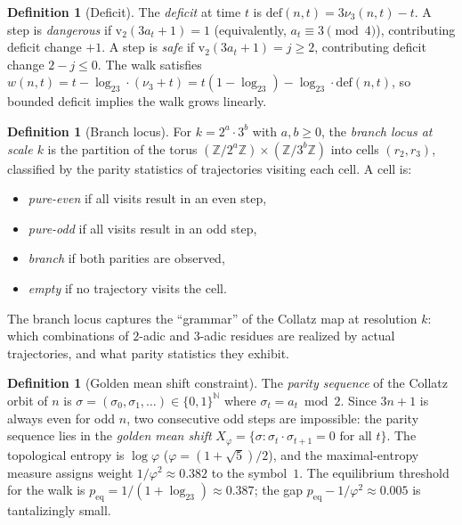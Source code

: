 \documentclass{CUP-JNL-FMP}%
\theoremstyle{definition}
\newtheorem{definition}[theorem]{Definition}
\numberwithin{equation}{section}
\newcommand{\ZZ}{\mathbb{Z}}
\newcommand{\NN}{\mathbb{N}}
\newcommand{\val}{\mathrm{v}_2}
\newcommand{\deficit}{\mathrm{def}}
\newcommand{\logb}{\log_2}
\begin{document}
\begin{definition}[Deficit]\label{def:deficit}
  The \emph{deficit} at time $t$ is $\deficit(n,t) = 3\nu_3(n,t) - t$.
  A step is \emph{dangerous} if $\val(3a_t+1) = 1$ (equivalently,
  $a_t \equiv 3 \pmod{4}$), contributing deficit change $+1$.
  A step is \emph{safe} if $\val(3a_t+1) = j \geq 2$, contributing
  deficit change $2 - j \leq 0$.  The walk satisfies
  $w(n,t) = t - \logb 3 \cdot (\nu_3 + t) = t(1 - \logb 3) - \logb 3 \cdot \deficit(n,t)$,
  so bounded deficit implies the walk grows linearly.
\end{definition}

\begin{definition}[Branch locus]\label{def:branchlocus}
  For $k = 2^a \cdot 3^b$ with $a, b \geq 0$, the \emph{branch locus at scale $k$}
  is the partition of the torus $(\ZZ/2^a\ZZ) \times (\ZZ/3^b\ZZ)$ into cells
  $(r_2, r_3)$, classified by the parity statistics of trajectories visiting each cell.
  A cell is:
  \begin{itemize}
    \item \emph{pure-even} if all visits result in an even step,
    \item \emph{pure-odd} if all visits result in an odd step,
    \item \emph{branch} if both parities are observed,
    \item \emph{empty} if no trajectory visits the cell.
  \end{itemize}
\end{definition}

The branch locus captures the ``grammar'' of the Collatz map at resolution $k$:
which combinations of $2$-adic and $3$-adic residues are realized by actual
trajectories, and what parity statistics they exhibit.

\begin{definition}[Golden mean shift constraint]\label{def:sft}
  The \emph{parity sequence} of the Collatz orbit of $n$ is
  $\sigma = (\sigma_0, \sigma_1, \ldots) \in \{0,1\}^{\NN}$ where
  $\sigma_t = a_t \bmod 2$. Since $3n+1$ is always even for odd $n$, two
  consecutive odd steps are impossible: the parity sequence lies in the
  \emph{golden mean shift} $X_\varphi = \{\sigma : \sigma_t \cdot \sigma_{t+1} = 0
  \text{ for all } t\}$. The topological entropy is $\log \varphi$
  ($\varphi = (1+\sqrt{5})/2$), and the maximal-entropy measure assigns
  weight $1/\varphi^2 \approx 0.382$ to the symbol~$1$. The equilibrium
  threshold for the walk is $p_{\mathrm{eq}} = 1/(1 + \logb 3) \approx 0.387$;
  the gap $p_{\mathrm{eq}} - 1/\varphi^2 \approx 0.005$ is tantalizingly small.
\end{definition}
\end{document}
